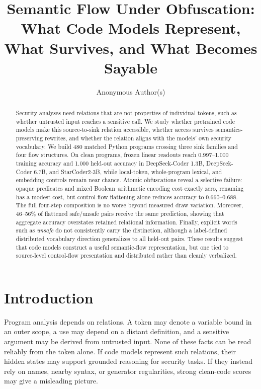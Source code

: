 \documentclass{article}
\title{Semantic Flow Under Obfuscation:\\What Code Models Represent, What Survives, and What Becomes Sayable}
\author{Anonymous Author(s)}
\begin{document}
\maketitle

\begin{abstract}
Security analyses need relations that are not properties of individual tokens, such as whether untrusted input reaches a sensitive call. We study whether pretrained code models make this source-to-sink relation accessible, whether access survives semantics-preserving rewrites, and whether the relation aligns with the models' own security vocabulary. We build 480 matched Python programs crossing three sink families and four flow structures. On clean programs, frozen linear readouts reach 0.997--1.000 training accuracy and 1.000 held-out accuracy in DeepSeek-Coder 1.3B, DeepSeek-Coder 6.7B, and StarCoder2-3B, while local-token, whole-program lexical, and embedding controls remain near chance. Atomic obfuscations reveal a selective failure: opaque predicates and mixed Boolean--arithmetic encoding cost exactly zero, renaming has a modest cost, but control-flow flattening alone reduces accuracy to 0.660--0.688. The full four-step composition is no worse beyond measured draw variation. Moreover, 46--56\% of flattened safe/unsafe pairs receive the same prediction, showing that aggregate accuracy overstates retained relational information. Finally, explicit words such as \emph{unsafe} do not consistently carry the distinction, although a label-defined distributed vocabulary direction generalizes to all held-out pairs. These results suggest that code models construct a useful semantic-flow representation, but one tied to source-level control-flow presentation and distributed rather than cleanly verbalized.
\end{abstract}

\section{Introduction}
Program analysis depends on relations. A token may denote a variable bound in an outer scope, a use may depend on a distant definition, and a sensitive argument may be derived from untrusted input. None of these facts can be read reliably from the token alone. If code models represent such relations, their hidden states may support grounded reasoning for security tasks. If they instead rely on names, nearby syntax, or generator regularities, strong clean-code scores may give a misleading picture.
\end{document}

